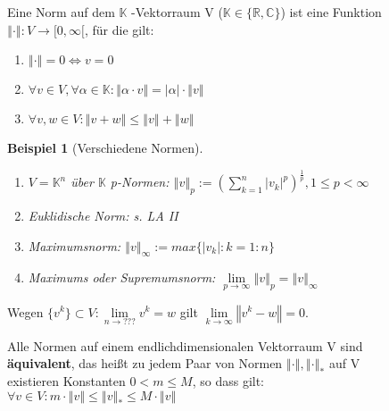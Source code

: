 \documentclass[a4paper,10pt]{article}
\newcommand{\norm}[1]{ \left\Vert #1 \right\Vert }
\newtheorem[L]{satz}{Satz}[section]
\newtheorem{bsp}{Beispiel}[section]
\newtheorem[S]{beweis}{Beweis}
\newtheorem[S]{beh}{Behauptung}
\begin{document}
Eine Norm auf dem $\mathbb{K}$ -Vektorraum V ($\mathbb{K} \in \{\mathbb{R}, \mathbb{C}\}$) ist eine Funktion \\$\norm{\cdot} : V \rightarrow [0,\infty[$, für die gilt:
                                                                                                                                                     \begin{enumerate}
                                                                                                                                                      \item $\norm{\cdot} = 0 \Leftrightarrow v = 0$
                                                                                                                                                      \item $\forall v \in V, \forall \alpha \in \mathbb{K} : \norm{\alpha \cdot v} = |\alpha| \cdot \norm{v}$
                                                                                                                                                      \item $\forall v, w \in V: \norm{v + w} \leq \norm{ v} + \norm{w}$
                                                                                                                                                     \end{enumerate}

\smallskip

\begin{bsp}[Verschiedene Normen]
\begin{enumerate}
 \item  $V = \mathbb{K}^n$ über $\mathbb{K}$
  p-Normen:
  $\norm{ v }_p := (\sum \limits_{k=1}^{n} |v_k|^p )^{\frac{1}{p}}, 1 \leq p < \infty$
  \item Euklidische Norm:
  s. LA II

 \item  Maximumsnorm:
  $\norm{v}_\infty := max\{|v_k|: k=1:n\}$
 \item  Maximums oder Supremumsnorm:
  $\lim\limits_{p \rightarrow \infty} \norm{v}_p = \norm{v}_\infty$
\end{enumerate}
\end{bsp}

Wegen $\{v^k\} \subset V : \lim\limits_{n \rightarrow ???} v^k = w $ gilt $ \lim\limits_{k \rightarrow \infty} \norm{v^ k - w} = 0 $.

\smallskip

\begin{satz}
Alle Normen auf einem endlichdimensionalen Vektorraum V sind \\\textbf{äquivalent}, das heißt zu jedem Paar von Normen $ \norm{\cdot}, \norm{\cdot}_* $ auf V \\existieren Konstanten
$0 < m \leq M$, so dass gilt:\\
$\forall v \in V: m \cdot \norm{v} \leq \norm{v}_* \leq M \cdot \norm{v} $
\end{satz}
\end{document}
